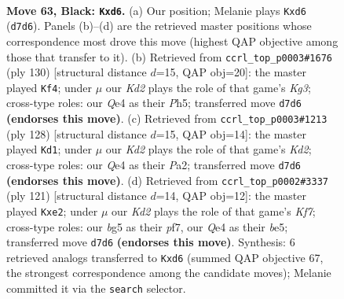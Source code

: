 \documentclass[11pt]{article}
\begin{document}
\clearpage

\begin{figure}[p]\centering
\begin{subfigure}{0.46\textwidth}\centering
\resizebox{\linewidth}{!}{%
\newchessgame
\chessboard[
  setfen={8/3k4/3P4/1K4Br/4q3/r7/8/8 b - - 0 63},
  showmover=false,
  pgfstyle=straightmove, color=movearrow, markmove={d7-d6}
]}
\caption{}
\end{subfigure}\hfill
\begin{subfigure}{0.46\textwidth}\centering
\resizebox{\linewidth}{!}{%
\newchessgame
\chessboard[
  setfen={8/8/2R1bk1p/7P/8/6K1/8/8 w - - 1 66},
  showmover=false,
  pgfstyle=straightmove, color=movearrow, markmove={g3-f4}
]}
\caption{}
\end{subfigure}
\\[4pt]
\begin{subfigure}{0.46\textwidth}\centering
\resizebox{\linewidth}{!}{%
\newchessgame
\chessboard[
  setfen={8/8/8/8/2kb2R1/p7/P2K4/8 w - - 0 65},
  showmover=false,
  pgfstyle=straightmove, color=movearrow, markmove={d2-d1}
]}
\caption{}
\end{subfigure}\hfill
\begin{subfigure}{0.46\textwidth}\centering
\resizebox{\linewidth}{!}{%
\newchessgame
\chessboard[
  setfen={5r2/5P2/8/2K1B3/P7/7p/4Bk2/8 b - - 0 61},
  showmover=false,
  pgfstyle=straightmove, color=movearrow, markmove={f2-e2}
]}
\caption{}
\end{subfigure}
\caption{\textbf{Move 63, Black: \texttt{Kxd6}.} (a) Our position; Melanie plays \texttt{Kxd6} (\texttt{d7d6}). Panels (b)--(d) are the retrieved master positions whose correspondence most drove this move (highest QAP objective among those that transfer to it). (b) Retrieved from \texttt{ccrl\_top\_p0003\#1676} (ply 130) [structural distance $d$=15, QAP obj=20]: the master played \texttt{Kf4}; under $\mu$ our \emph{Kd2} plays the role of that game's \emph{Kg3}; cross-type roles: our \emph{Q}e4 as their \emph{P}h5; transferred move \texttt{d7d6} \textbf{(endorses this move)}. (c) Retrieved from \texttt{ccrl\_top\_p0003\#1213} (ply 128) [structural distance $d$=15, QAP obj=14]: the master played \texttt{Kd1}; under $\mu$ our \emph{Kd2} plays the role of that game's \emph{Kd2}; cross-type roles: our \emph{Q}e4 as their \emph{P}a2; transferred move \texttt{d7d6} \textbf{(endorses this move)}. (d) Retrieved from \texttt{ccrl\_top\_p0002\#3337} (ply 121) [structural distance $d$=14, QAP obj=12]: the master played \texttt{Kxe2}; under $\mu$ our \emph{Kd2} plays the role of that game's \emph{Kf7}; cross-type roles: our \emph{b}g5 as their \emph{p}f7, our \emph{Q}e4 as their \emph{b}e5; transferred move \texttt{d7d6} \textbf{(endorses this move)}. Synthesis: 6 retrieved analogs transferred to \texttt{Kxd6} (summed QAP objective 67, the strongest correspondence among the candidate moves); Melanie committed it via the \texttt{search} selector.}
\label{fig:thought-m125}
\end{figure}
\end{document}
